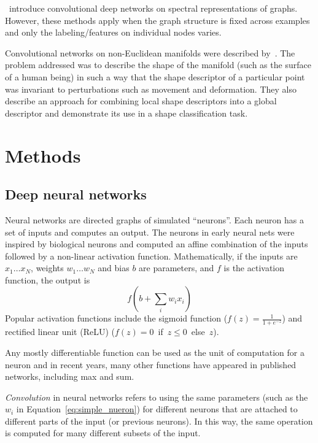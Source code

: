 \citet{bruna2013spectral}~introduce convolutional deep networks on spectral
representations of graphs. However, these methods apply when the graph structure
is fixed across examples and only the labeling/features on individual nodes
varies.

Convolutional networks on non-Euclidean manifolds were described
by~\citet{masci2015geodesic}. The problem addressed was to describe
the shape of the manifold (such as the surface of a human being) in such a way
that the shape descriptor of a particular point was invariant to perturbations
such as movement and deformation. They also describe an approach for combining
local shape descriptors into a global descriptor and demonstrate its use in a
shape classification task.

\section{Methods}

\subsection{Deep neural networks}\label{sec:neural_nets}

Neural networks are directed graphs of simulated ``neurons''. Each neuron has a
set of inputs and computes an output. The neurons in early neural nets were
inspired by biological neurons and computed an affine combination of the inputs
followed by a non-linear activation function. Mathematically, if the inputs are
$x_1 \dots x_N$, weights $w_1 \dots w_N$ and bias $b$ are parameters, and $f$ is
the activation function, the output is
\begin{equation}\label{eq:simple_nueron}
  f(b + \sum_i w_i x_i)
\end{equation}
Popular activation functions include the sigmoid function ($f(z) = \frac{1}{1+e^{-z}}$)
and rectified linear unit (ReLU) ($f(z)=0$~if~$z\leq 0$~else~$z$).

Any mostly differentiable function can be
used as the unit of computation for a neuron and in recent years, many other
functions have appeared in published networks, including max and sum.

\emph{Convolution} in neural networks refers to using the same parameters (such as the
$w_i$ in Equation~\ref{eq:simple_nueron}) for different neurons that are attached
to different parts of the input (or previous neurons). In this way, the same
operation is computed for many different subsets of the input.

